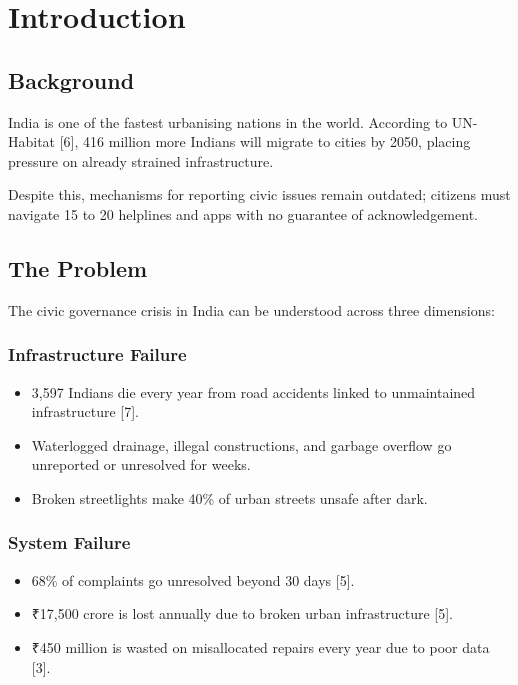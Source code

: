 \documentclass[12pt,a4paper]{report}
\begin{document}
\pagestyle{plain}

\newpage

\chapter[INTRODUCTION]{Introduction}

\section{Background}

India is one of the fastest urbanising nations in the world. According to
UN-Habitat [6], 416 million more Indians will migrate to cities by 2050,
placing pressure on already strained infrastructure.

Despite this, mechanisms for reporting civic issues remain outdated; citizens must
navigate 15 to 20 helplines and apps with no guarantee of acknowledgement.

\section{The Problem}

The civic governance crisis in India can be understood across three dimensions:

\subsection{Infrastructure Failure}

\begin{itemize}
    \item 3,597 Indians die every year from road accidents linked to
    unmaintained infrastructure [7].
    \item Waterlogged drainage, illegal constructions, and garbage overflow go
    unreported or unresolved for weeks.
    \item Broken streetlights make 40\% of urban streets unsafe after dark.
\end{itemize}

\subsection{System Failure}

\begin{itemize}
    \item 68\% of complaints go unresolved beyond 30 days
    [5].
    \item ₹17,500 crore is lost annually due to broken urban infrastructure
    [5].
    \item ₹450 million is wasted on misallocated repairs every year due to
    poor data [3].
\end{itemize}
\end{document}
